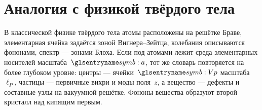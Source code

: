 \section{Аналогия с физикой твёрдого тела}

В классической физике твёрдого тела атомы расположены на решётке Браве,
элементарная ячейка задаётся зоной Вигнера--Зейтца, колебания описываются фононами,
спектр --- зонами Блоха.
Если под атомами лежит среда элементарных носителей масштаба~$\caStepSpace$,
тот же словарь повторяется на более глубоком уровне:
центры --- ячейки~$\hv$ масштаба~$\ell_P$,
частицы --- первичные вихри и моды поля~$z$,
а вещество --- дефекты и составные узлы на вакуумной решётке.
Фононы вещества образуют второй кристалл над кипящим первым.

